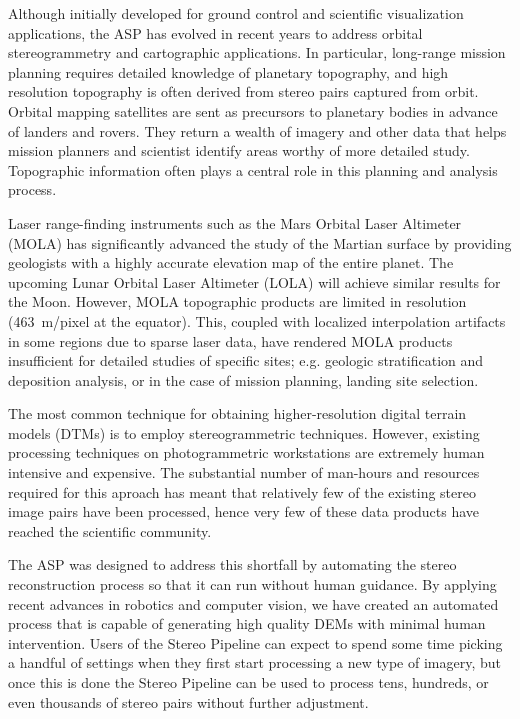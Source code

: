 Although initially developed for ground control and scientific
visualization applications, the ASP has evolved in recent years to
address orbital stereogrammetry and cartographic applications.  In
particular, long-range mission planning requires detailed knowledge of
planetary topography, and high resolution topography is often derived
from stereo pairs captured from orbit.  Orbital mapping satellites are
sent as precursors to planetary bodies in advance of landers and
rovers.  They return a wealth of imagery and other data that helps
mission planners and scientist identify areas worthy of more detailed
study. Topographic information often plays a central role in this
planning and analysis process.

Laser range-finding instruments such as the Mars Orbital Laser
Altimeter (MOLA) \citep{1992JGR....97.7781Z,2001JGR...10623689S}
has signiﬁcantly advanced the study of the Martian surface by
providing geologists with a highly accurate elevation map of the
entire planet.  The upcoming Lunar Orbital Laser Altimeter (LOLA)
\citep{2008AGUFM.P31B1419N,2007SSRv..129..391C} will achieve similar
results for the Moon.  However, MOLA topographic products are limited
in resolution (463~m/pixel at the equator).  This, coupled with
localized interpolation artifacts in some regions due to sparse
laser data, have rendered MOLA products insufficient for detailed
studies of speciﬁc sites; e.g. geologic stratification and deposition
analysis, or in the case of mission planning, landing site selection.

The most common technique for obtaining higher-resolution digital
terrain models (DTMs) is to employ stereogrammetric techniques.
However, existing processing techniques on photogrammetric
workstations are extremely human intensive and expensive.  The
substantial number of man-hours and resources required for this
aproach has meant that relatively few of the existing stereo image
pairs have been processed, hence very few of these data products have
reached the scientific community.

The ASP was designed to address this shortfall by automating the
stereo reconstruction process so that it can run without human
guidance.  By applying recent advances in robotics and computer
vision, we have created an automated process that is capable of
generating high quality DEMs with minimal human intervention.  Users
of the Stereo Pipeline can expect to spend some time picking a handful
of settings when they first start processing a new type of imagery,
but once this is done the Stereo Pipeline can be used to process tens,
hundreds, or even thousands of stereo pairs without further
adjustment.


